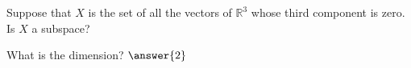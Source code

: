 \documentclass{ximera}
\begin{document}
\begin{exercise}
    Suppose that $X$ is the set of all the vectors of ${\mathbb{R}}^3$ whose third component is zero.  Is $X$ a subspace?  
    \begin{multipleChoice}
    \end{multipleChoice}
    \begin{problem}
        What is the dimension? $\answer{2}$
    \end{problem}
\end{exercise}
%

\end{document}
